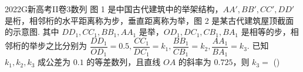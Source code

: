 
\begin{problem}{2022}{G}{新高考II卷}{3}{数列}
图 1 是中国古代建筑中的举架结构，$AA', BB', CC', DD'$ 是桁，相邻桁的水平距离称为步，垂直距离称为举，图 2 是某古代建筑屋顶截面的示意图. 其中 $DD_1, CC_1, BB_1, AA_1$ 是举，$OD_1, DC_1, CB_1, BA_1$ 是相等的步，相邻桁的举步之比分别为 $\dfrac{DD_1}{OD_1}=0.5, \dfrac{CC_1}{DC_1}=k_1, \dfrac{BB_1}{CB_1}=k_2, \dfrac{AA_1}{BA_1}=k_3$. 已知 $k_1, k_2, k_3$ 成公差为 $0.1$  的等差数列，且直线 $OA$ 的斜率为 $ 0.725$，则 $k_3=$
(\hspace{1cm})
\begin{choices}
\end{choices}
\end{problem}
